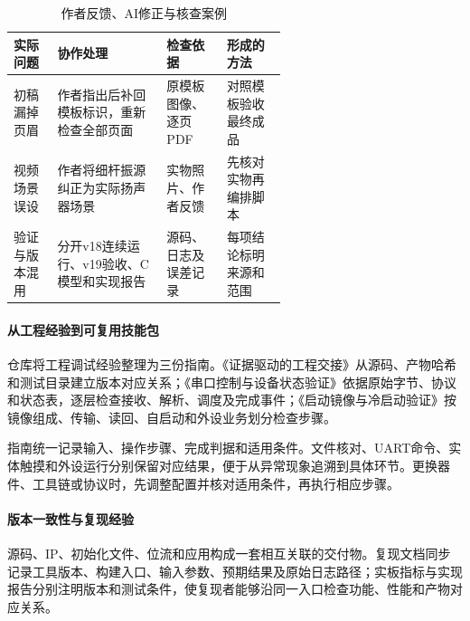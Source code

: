\documentclass[UTF8,a4paper,zihao=-4,fontset=none]{ctexart}
\renewcommand{\small}{\fontsize{10.5pt}{13pt}\selectfont}
\numberwithin{figure}{section}
\numberwithin{table}{section}
\begin{document}
\begin{table}[htbp]
  \centering\small
  \caption{作者反馈、AI修正与核查案例}
  \label{tab:collaboration}
  \begin{tabularx}{\linewidth}{@{}p{0.16\linewidth}Xp{0.22\linewidth}p{0.22\linewidth}@{}}
    \toprule
    实际问题 & 协作处理 & 检查依据 & 形成的方法 \\
    \midrule
    初稿漏掉页眉 & 作者指出后补回模板标识，重新检查全部页面 & 原模板图像、逐页PDF & 对照模板验收最终成品 \\
    视频场景误设 & 作者将细杆振源纠正为实际扬声器场景 & 实物照片、作者反馈 & 先核对实物再编排脚本 \\
    验证与版本混用 & 分开v18连续运行、v19验收、C模型和实现报告 & 源码、日志及误差记录 & 每项结论标明来源和范围 \\
    \bottomrule
  \end{tabularx}
\end{table}

\paragraph{从工程经验到可复用技能包}
仓库将工程调试经验整理为三份指南\cite{repo}。《证据驱动的工程交接》从源码、产物哈希和测试目录建立版本对应关系；《串口控制与设备状态验证》依据原始字节、协议和状态表，逐层检查接收、解析、调度及完成事件；《启动镜像与冷启动验证》按镜像组成、传输、读回、自启动和外设业务划分检查步骤。

指南统一记录输入、操作步骤、完成判据和适用条件。文件核对、UART命令、实体触摸和外设运行分别保留对应结果，便于从异常现象追溯到具体环节。更换器件、工具链或协议时，先调整配置并核对适用条件，再执行相应步骤。

\paragraph{版本一致性与复现经验}
源码、IP、初始化文件、位流和应用构成一套相互关联的交付物。复现文档同步记录工具版本、构建入口、输入参数、预期结果及原始日志路径；实板指标与实现报告分别注明版本和测试条件，使复现者能够沿同一入口检查功能、性能和产物对应关系。

\FloatBarrier
\end{document}
